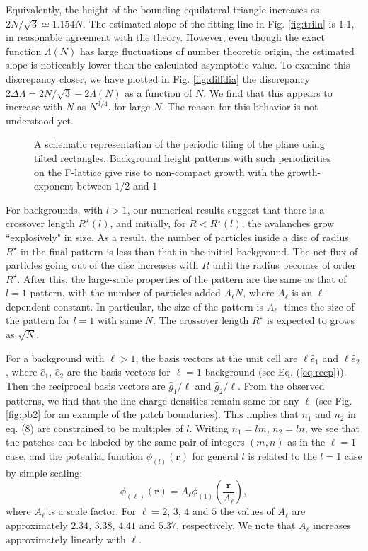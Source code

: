 \documentclass[11pt,a4paper]{book}
\begin{document}
Equivalently, the height of the bounding equilateral triangle
increases as $ 2 N/\sqrt{3} \simeq 1.154 N$. The estimated slope of
the fitting line in Fig. \ref{fig:triln} is 1.1, in reasonable agreement with the
theory. However,  even though the exact function $\Lambda(N)$  has
large  fluctuations of number theoretic origin, the estimated slope is
noticeably lower than the calculated asymptotic value.  To examine
this discrepancy closer, we have plotted in Fig. \ref{fig:diffdia} the
discrepancy $2 \Delta \Lambda  = 2 N/\sqrt{3} - 2 \Lambda(N)$ as a
function of $N$. We find that this appears to increase with $N$ as
$N^{3/4}$, for large $N$. The reason for this behavior is not
understood yet.
%
\begin{SCfigure}
\caption{A schematic representation of the periodic tiling of the  plane using tilted rectangles. Background 
height patterns with such periodicities on the F-lattice give rise to non-compact growth with the growth-exponent between  $1/2$  and  $ 1$  }
\label{fig:tile_f}
\end{SCfigure}
%

For backgrounds, with $l > 1$, our numerical results suggest that there is a
crossover length $R^\star(l)$, and initially, for $R < R^\star(l)$, the
avalanches grow ``explosively" in size. As a result, the number of
particles  inside a disc of radius $R^\star$ in the final  pattern  is less
than that in the initial background. The net flux of particles going
out of the disc increases with $R$ until the radius becomes of order
$R^\star$. After this, the large-scale properties of the pattern
are the same as that of $l=1$ pattern, with the number of particles added
$A_{\ell} N$, where $A_{\ell}$ is an $\ell$-dependent constant. In
particular, the size of the pattern is $A_{\ell}$ -times the size
of the pattern for $l=1$ with same $N$.  The crossover length
$R^\star$ is expected to grows as $\sqrt{N}$.

For a background with   $\ell > 1$,  the
basis vectors at the unit cell are $\ell\hat{e}_1$ and
$\ell\hat{e}_2$, where $\hat{e}_1$, $\hat{e}_2$ are the basis vectors
for $\ell=1$ background (see Eq. (\ref{eq:recp})). Then the reciprocal basis vectors are
$\hat{g}_1/\ell$ and
$\hat{g}_2/\ell$.  From the observed patterns, we find  that the line charge
densities remain same for any $\ell$ (see Fig. \ref{fig:pb2} for an
example of the patch boundaries).  This implies that $n_1$ and $n_2$ in eq. (8) are constrained to be
multiples of $l$. Writing $n_1 = l m$, $n_2 = l n$, we see that 
the patches can be labeled by the same pair of integers $\left( m,n
\right)$ as in the $\ell=1$ case, and the potential function
$\phi_{(l)}\left( \mathbf{r} \right)$ for general $l$ is related to the $l=1$ case by simple scaling:
\begin{equation}
\phi_{(\ell)}\left( \mathbf{r} \right) =  A_{\ell} \phi_{(1)}\left(
\frac{\mathbf{r} }{A_{\ell} }\right),
\end{equation}
where $A_{\ell}$ is a scale factor. For $\ell=2$, $3$, $4$ and
$5$ the values of $A_\ell$ are approximately $2.34$, $3.38$, $4.41$ and $5.37$,
respectively. We note that $A_\ell$ increases approximately linearly
with $\ell$.
\end{document}
